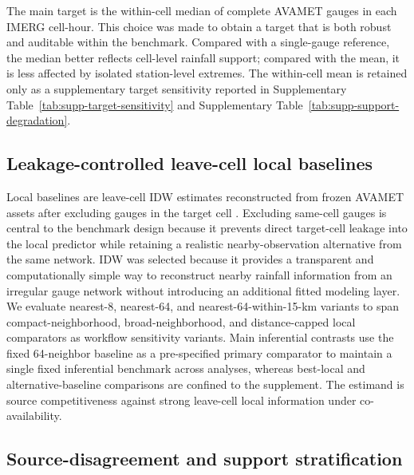 \documentclass[preprint,12pt]{elsarticle}
\begin{document}
The main target is the within-cell median of complete AVAMET gauges in each IMERG cell-hour. This choice was made to obtain a target that is both robust and auditable within the benchmark. Compared with a single-gauge reference, the median better reflects cell-level rainfall support; compared with the mean, it is less affected by isolated station-level extremes. The within-cell mean is retained only as a supplementary target sensitivity reported in Supplementary Table~\ref{tab:supp-target-sensitivity} and Supplementary Table~\ref{tab:supp-support-degradation}.

\subsection{Leakage-controlled leave-cell local baselines}

Local baselines are leave-cell IDW estimates reconstructed from frozen AVAMET assets after excluding gauges in the target cell \citep{shepard1968idw,kurtzman2009interpolation}. Excluding same-cell gauges is central to the benchmark design because it prevents direct target-cell leakage into the local predictor while retaining a realistic nearby-observation alternative from the same network. IDW was selected because it provides a transparent and computationally simple way to reconstruct nearby rainfall information from an irregular gauge network without introducing an additional fitted modeling layer. We evaluate nearest-8, nearest-64, and nearest-64-within-15-km variants to span compact-neighborhood, broad-neighborhood, and distance-capped local comparators as workflow sensitivity variants. Main inferential contrasts use the fixed 64-neighbor baseline as a pre-specified primary comparator to maintain a single fixed inferential benchmark across analyses, whereas best-local and alternative-baseline comparisons are confined to the supplement. The estimand is source competitiveness against strong leave-cell local information under co-availability.

\subsection{Source-disagreement and support stratification}
\end{document}
